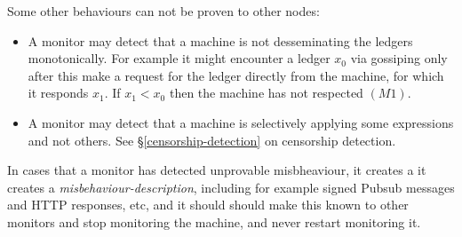 \documentclass[a4paper, oneside, 10pt]{amsart}
\begin{document}
Some other behaviours can not be proven to other nodes:
\begin{itemize}
\item
  A monitor may detect that a machine is not desseminating the ledgers
  monotonically. For example it might encounter a ledger $x_0$ via gossiping
  only after this make a request for the ledger directly from the machine, for
  which it responds $x_1$. If $x_1 < x_0$ then the machine has not respected
  $(M1)$.
\item
  A monitor may detect that a machine is selectively applying some expressions
  and not others. See \S\ref{censorship-detection} on censorship detection.
\end{itemize}
In cases that a monitor has detected unprovable misbheaviour, it creates a it
creates a \emph{misbehaviour-description}, including for example signed Pubsub
messages and HTTP responses, etc, and it should should make this known to other
monitors and stop monitoring the machine, and never restart monitoring it.
\end{document}
